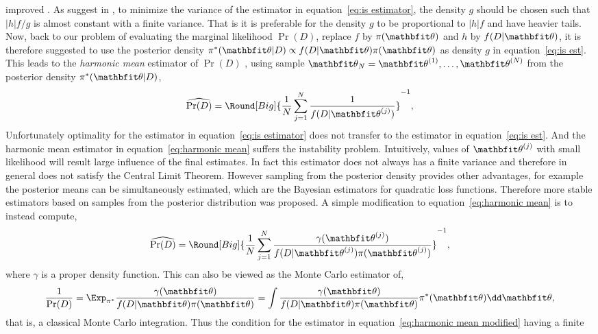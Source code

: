 improved \parencite{Casella1998}. As suggest in
\textcite[][sec.~3.3]{Robert2004}, to minimize the variance of the estimator
in equation~\eqref{eq:is estimator}, the density $g$ should be chosen such
that $|h|f/g$ is almost constant with a finite variance. That is it is
preferable for the density $g$ to be proportional to $|h|f$ and have heavier
tails. Now, back to our problem of evaluating the marginal likelihood
$\Pr(D)$, replace $f$ by $\pi(\bth)$ and $h$ by $f(D|\bth)$, it is therefore
suggested to use the posterior density $\pi^*(\bth|D) \propto
f(D|\bth)\pi(\bth)$ as density $g$ in equation~\eqref{eq:is est}. This leads
to the \emph{harmonic mean} estimator of $\Pr(D)$ \parencite{Newton:1994wm},
using sample $\bth_N= \mcvec{\bth}{N}$ from the posterior density
$\pi^*(\bth|D)$,
\begin{equation}
  \widehat{\Pr(D)} =
  \Round[Big]{\frac{1}{N}\sum_{j=1}^N\frac{1}{f(D|\bth^{(j)})}}^{-1},
  \label{eq:harmonic mean}
\end{equation}
Unfortunately optimality for the estimator in equation~\eqref{eq:is estimator}
does not transfer to the estimator in equation~\eqref{eq:is est}. And the
harmonic mean estimator in equation~\eqref{eq:harmonic mean} suffers the
instability problem. Intuitively, values of $\bth^{(j)}$ with small likelihood
will result large influence of the final estimates. In fact this estimator
does not always has a finite variance and therefore in general does not
satisfy the Central Limit Theorem. However sampling from the posterior density
provides other advantages, for example the posterior means can be
simultaneously estimated, which are the Bayesian estimators for quadratic loss
functions. Therefore more stable estimators based on samples from the
posterior distribution was proposed. A simple modification to
equation~\eqref{eq:harmonic mean} is to instead compute,
\begin{equation}
  \widehat{\Pr(D)} = \Round[Big]{
    \frac{1}{N}\sum_{j=1}^N\frac{\gamma(\bth^{(j)})}
    {f(D|\bth^{(j)})\pi(\bth^{(j)})}}^{-1},
  \label{eq:harmonic mean modified}
\end{equation}
where $\gamma$ is a proper density function. This can also be viewed as the
Monte Carlo estimator of,
\begin{equation}
  \frac{1}{\Pr(D)}
  = \Exp_{\pi^*}\frac{\gamma(\bth)}{f(D|\bth)\pi(\bth)}
  = \int\frac{\gamma(\bth)}{f(D|\bth)\pi(\bth)}\pi^*(\bth)\dd\bth,
\end{equation}
that is, a classical Monte Carlo integration. Thus the condition for the
estimator in equation~\eqref{eq:harmonic mean modified} having a finite

